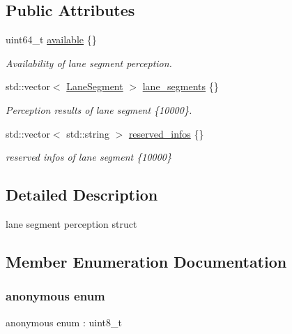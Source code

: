 \subsection*{Public Attributes}
\begin{DoxyCompactItemize}
\item 
uint64\+\_\+t \hyperlink{structmaf__perception__interface_1_1LaneSegmentPerception_a578c7fa98623179356f520be3e0bbf31}{available} \{\}
\begin{DoxyCompactList}\small\item\em Availability of lane segment perception. \end{DoxyCompactList}\item 
std\+::vector$<$ \hyperlink{structmaf__perception__interface_1_1LaneSegment}{Lane\+Segment} $>$ \hyperlink{structmaf__perception__interface_1_1LaneSegmentPerception_ae65212eafe621a28df2c3ad7fcbddb22}{lane\+\_\+segments} \{\}
\begin{DoxyCompactList}\small\item\em Perception results of lane segment \{10000\}. \end{DoxyCompactList}\item 
std\+::vector$<$ std\+::string $>$ \hyperlink{structmaf__perception__interface_1_1LaneSegmentPerception_a5630823b7f85998b26b8fc6b759a7451}{reserved\+\_\+infos} \{\}
\begin{DoxyCompactList}\small\item\em reserved infos of lane segment \{10000\} \end{DoxyCompactList}\end{DoxyCompactItemize}


\subsection{Detailed Description}
lane segment perception struct 

\subsection{Member Enumeration Documentation}
\mbox{\label{structmaf__perception__interface_1_1LaneSegmentPerception_aabc223f0fc45ce0b775528cdb058e0a6}} 
\subsubsection{\texorpdfstring{anonymous enum}{anonymous enum}}
{\footnotesize\ttfamily anonymous enum \+: uint8\+\_\+t}

